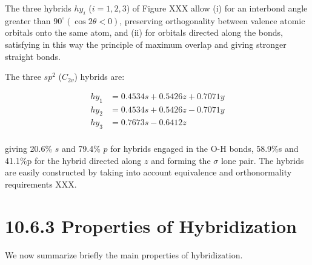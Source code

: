 \documentclass[
  9pt,
]{extbook}
\theoremstyle{definition}
\theoremstyle{definition}
\theoremstyle{definition}
\theoremstyle{remark}
\begin{document}
The three hybrids \(hy_i\) (\(i = 1,2,3\)) of Figure XXX allow (i) for an interbond angle greater than \(90^{\circ} (\cos2\theta < 0)\), preserving orthogonality between valence atomic orbitals onto the same atom, and (ii) for orbitals directed along the bonds, satisfying in this way the principle of maximum overlap and giving stronger straight bonds.

The three \(sp^2\) (\(C_{2v}\)) hybrids are:

\begin{equation}
\begin{aligned}
hy_1 &= 0.4534s + 0.5426z + 0.7071y \\
hy_2 &= 0.4534s + 0.5426z - 0.7071y \\
hy_3 &= 0.7673s - 0.6412z \\
\end{aligned}
\label{eq:poly1}
\end{equation}

giving 20.6\% \(s\) and 79.4\% \(p\) for hybrids engaged in the O-H bonds, 58.9\%s and 41.1\%p for the hybrid directed along \(z\) and forming the \(\sigma\) lone pair. The hybrids are easily constructed by taking into account equivalence and orthonormality requirements XXX.

\hypertarget{properties-of-hybridization}{%
\section{10.6.3 Properties of Hybridization}\label{properties-of-hybridization}}

We now summarize brieﬂy the main properties of hybridization.
\end{document}
